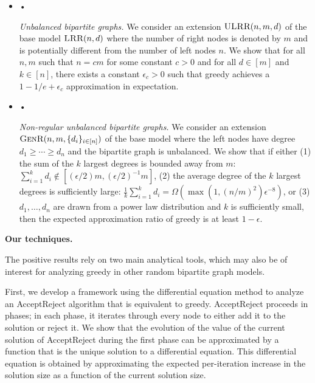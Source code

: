 \documentclass[10pt,a4paper]{article}
\begin{document}
\begin{itemize}


\item[] • 


\emph{Unbalanced bipartite graphs.}
We consider an extension $\textsc{ULRR}(n,m,d)$ of the base model $\textsc{LRR}(n,d)$ where the number of right nodes is denoted by $m$ and is potentially different from the number of left nodes $n$. We show that for all $n,m$ such that $n=cm$ for some constant $c>0$ and for all $d\in[m]$ and $k\in[n]$, there exists a constant $\epsilon_{c}>0$ such that greedy achieves a $1-1/e+\epsilon_{c}$ approximation in expectation.\par




\item[] • 


\emph{Non-regular unbalanced bipartite graphs.}
We consider an extension $\textsc{GenR}(n,m,\{d_{i}\}_{i\in[n]})$ of the base model where the left nodes have degree $d_{1}\geq\cdots\geq d_{n}$ and the bipartite graph is unbalanced. We show that if either (1) the sum of the $k$ largest degrees is bounded away from $m$: $\sum_{i=1}^{k}d_{i}\not\in[(\epsilon/2)m,(\epsilon/2)^{-1}m]$, (2) the average degree of the $k$ largest degrees is sufficiently large: $\frac{1}{k}\sum_{i=1}^{k}d_{i}=\Omega(\max(1,(n/m)^{2})\epsilon^{-8})$, or (3) $d_{1},\ldots,d_{n}$ are drawn from a power law distribution and $k$ is sufficiently small, then the expected approximation ratio of greedy is at least $1-\epsilon$.\par




\end{itemize}





\par\medskip\noindent\textbf{Our techniques.}\par




The positive results rely on two main analytical tools, which may also be of interest for analyzing greedy in other random bipartite graph models.\par




First, we develop a framework using the differential equation method to analyze an AcceptReject algorithm that is equivalent to greedy. AcceptReject proceeds in phases; in each phase, it iterates through every node to either add it to the solution or reject it. We show that the evolution of the value of the current solution of AcceptReject during the first phase can be approximated by a function that is the unique solution to a differential equation. This differential equation is obtained by approximating the expected per-iteration increase in the solution size as a function of the current solution size.\par
\end{document}
